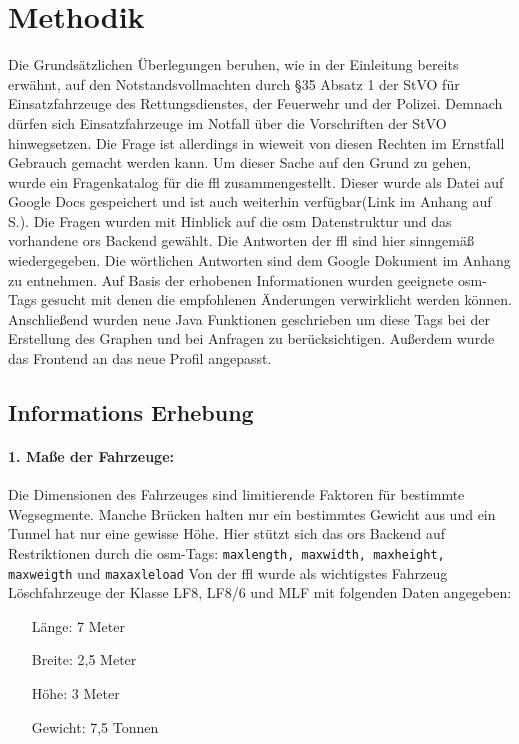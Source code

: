 \section{Methodik}
Die Grundsätzlichen Überlegungen beruhen, wie in der Einleitung bereits erwähnt, auf den Notstandsvollmachten durch §35 Absatz 1 der StVO für Einsatzfahrzeuge des Rettungsdienstes, der Feuerwehr und der Polizei.
Demnach dürfen sich Einsatzfahrzeuge im Notfall über die Vorschriften der StVO hinwegsetzen.
Die Frage ist allerdings in wieweit von diesen Rechten im Ernstfall Gebrauch gemacht werden kann.
Um dieser Sache auf den Grund zu gehen, wurde ein Fragenkatalog für die \gls{ffl} zusammengestellt.
Dieser wurde als Datei auf Google Docs gespeichert und ist auch weiterhin verfügbar(Link im Anhang auf S.\pageref{sec:anhang}).
Die Fragen wurden mit Hinblick auf die \gls{osm} Datenstruktur und das vorhandene \gls{ors} Backend gewählt.
Die Antworten der \gls{ffl} sind hier sinngemäß wiedergegeben.
Die wörtlichen Antworten sind dem Google Dokument im Anhang zu entnehmen.
Auf Basis der erhobenen Informationen wurden geeignete \gls{osm}-Tags gesucht mit denen die empfohlenen Änderungen verwirklicht werden können.
Anschließend wurden neue Java Funktionen geschrieben um diese Tags bei der Erstellung des Graphen und bei Anfragen zu berücksichtigen.
Außerdem wurde das Frontend an das neue Profil angepasst.

\subsection{Informations Erhebung}

\paragraph*{1. Maße der Fahrzeuge:}
\label{frage1}
\par
Die Dimensionen des Fahrzeuges sind limitierende Faktoren für bestimmte Wegsegmente.
Manche Brücken halten nur ein bestimmtes Gewicht aus und ein Tunnel hat nur eine gewisse Höhe.
Hier stützt sich das \gls{ors} Backend auf Restriktionen durch die \gls{osm}-Tags: \texttt{maxlength, maxwidth, maxheight, maxweigth} und \texttt{maxaxleload} Von der \gls{ffl} wurde als wichtigstes Fahrzeug Löschfahrzeuge der Klasse LF8, LF8/6 und MLF mit folgenden Daten angegeben:
\begin{itemize}
\centering
\item[Länge:] 7 Meter
\item[Breite:] 2,5 Meter
\item[Höhe:] 3 Meter
\item[Gewicht:] 7,5 Tonnen
\end{itemize}


